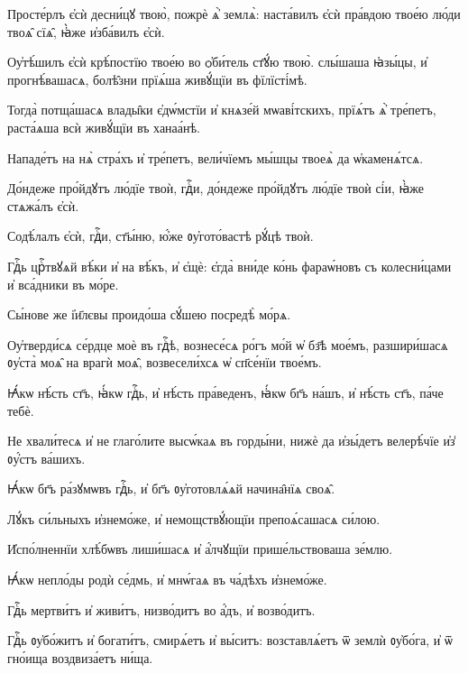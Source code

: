 \hKv Просте́рлъ є҆сѝ десни́цꙋ твою̀, пожрѐ ѧ҆̀ землѧ̀:  наста́вилъ є҆сѝ пра́вдою твое́ю лю́ди твоѧ̑ сїѧ̑, ꙗ҆̀же  и҆зба́вилъ є҆сѝ.  

\hKv Оу҆тѣ́шилъ є҆сѝ крѣ́постїю твое́ю во ѻ҆би́тель ст҃ꙋ́ю  твою̀. слы́шаша ꙗ҆зы́цы, и҆ прогнѣ́вашасѧ, болѣ̑зни  прїѧ́ша живꙋ́щїи въ фїлїсті́мѣ. 
%

\hKv Тогда̀ потща́шасѧ влады̑ки є҆дѡ́мстїи и҆ кнѧзе́й  мѡаві́тскихъ, прїѧ́тъ ѧ҆̀ тре́петъ, раста́ѧша всѝ живꙋ́щїи  въ ханаа́нѣ.  

\hKv Нападе́тъ на нѧ̀ стра́хъ и҆ тре́петъ, вели́чїемъ мы́шцы  твоеѧ̀ да ѡ҆каменѧ́тсѧ.  
%

\hKv До́ндеже про́йдꙋтъ лю́дїе твоѝ, гдⷭ҇и, до́ндеже  про́йдꙋтъ лю́дїе твоѝ сі́и, ꙗ҆̀же стѧжа́лъ є҆сѝ. 

\hKv Содѣ́лалъ є҆сѝ, гдⷭ҇и, ст҃ы́ню, ю҆́же ᲂу҆гото́вастѣ  рꙋ́цѣ твоѝ. 
%

\hKv Гдⷭ҇ь црⷭ҇твꙋѧй вѣ́ки и҆ на вѣ́къ, и҆ є҆щѐ:  є҆гда̀ вни́де ко́нь фараѡ́новъ съ колесни́цами и҆ вса́дники  въ мо́ре. 

\hKv Сы́нове же і҆и҃лєвы проидо́ша сꙋ́шею посредѣ̀ мо́рѧ. 
%

%

\hKv Оу҆тверди́сѧ се́рдце моѐ въ гдⷭ҇ѣ, вознесе́сѧ ро́гъ мо́й  ѡ҆ бз҃ѣ мое́мъ, разшири́шасѧ ᲂу҆ста̀ моѧ̑ на врагѝ моѧ̑,  возвесели́хсѧ ѡ҆ сп҃се́нїи твое́мъ.  

\hKv Ꙗ҆́кѡ нѣ́сть ст҃ъ, ꙗ҆́кѡ гдⷭ҇ь, и҆ нѣ́сть пра́веденъ,  ꙗ҆́кѡ бг҃ъ на́шъ, и҆ нѣ́сть ст҃ъ, па́че тебѐ. 

\hKv Не хвали́тесѧ и҆ не глаго́лите высѡ́каѧ въ горды́ни, нижѐ  да и҆зы́детъ велерѣ́чїе и҆з̾ ᲂу҆́стъ ва́шихъ. 

\hKv Ꙗ҆́кѡ бг҃ъ ра́зꙋмѡвъ гдⷭ҇ь, и҆ бг҃ъ ᲂу҆готовлѧ́ѧй  начина̑нїѧ своѧ̑. 
%

\hKv Лꙋ́къ си́льныхъ и҆знемо́же, и҆ немощствꙋ́ющїи  препоѧ́сашасѧ си́лою. 

\hKv И҆спо́лненнїи хлѣ́бѡвъ лиши́шасѧ и҆ а҆́лчꙋщїи  прише́льствоваша зе́млю. 

\hKv Ꙗ҆́кѡ непло́ды родѝ се́дмь, и҆ мнѡ́гаѧ въ ча́дѣхъ  и҆знемо́же. 

\hKv Гдⷭ҇ь мертви́тъ и҆ живи́тъ, низво́дитъ во а҆́дъ, и҆  возво́дитъ. 

\hKv Гдⷭ҇ь ᲂу҆бо́житъ и҆ богати́тъ, смирѧ́етъ и҆ вы́ситъ:  возставлѧ́етъ ѿ землѝ ᲂу҆бо́га, и҆ ѿ гно́ища  воздвиза́етъ ни́ща. 

